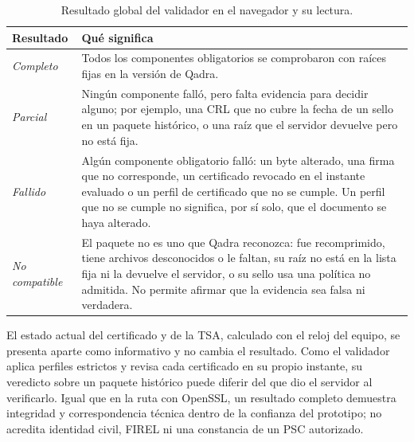 \begin{table}[H]
  \centering
  \caption{Resultado global del validador en el navegador y su lectura.}
  \label{tab:verificacion-resultados}
  \begin{tabularx}{\linewidth}{@{}l X@{}}
    \toprule
    \textbf{Resultado} & \textbf{Qué significa} \\
    \midrule
    \emph{Completo} & Todos los componentes obligatorios se comprobaron con raíces fijas en la versión de Qadra. \\
    \emph{Parcial} & Ningún componente falló, pero falta evidencia para decidir alguno; por ejemplo, una CRL que no cubre la fecha de un sello en un paquete histórico, o una raíz que el servidor devuelve pero no está fija. \\
    \emph{Fallido} & Algún componente obligatorio falló: un byte alterado, una firma que no corresponde, un certificado revocado en el instante evaluado o un perfil de certificado que no se cumple. Un perfil que no se cumple no significa, por sí solo, que el documento se haya alterado. \\
    \emph{No compatible} & El paquete no es uno que Qadra reconozca: fue recomprimido, tiene archivos desconocidos o le faltan, su raíz no está en la lista fija ni la devuelve el servidor, o su sello usa una política no admitida. No permite afirmar que la evidencia sea falsa ni verdadera. \\
    \bottomrule
  \end{tabularx}
\end{table}

El estado actual del certificado y de la TSA, calculado con el reloj del equipo, se presenta aparte como informativo y no cambia el resultado. Como el validador aplica perfiles estrictos y revisa cada certificado en su propio instante, su veredicto sobre un paquete histórico puede diferir del que dio el servidor al verificarlo. Igual que en la ruta con OpenSSL, un resultado completo demuestra integridad y correspondencia técnica dentro de la confianza del prototipo; no acredita identidad civil, FIREL ni una constancia de un PSC autorizado.
